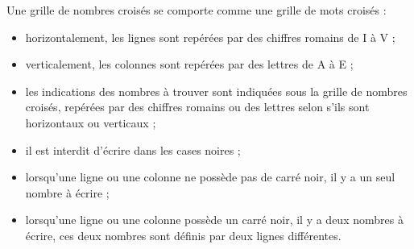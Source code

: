 \begin{colonne*exercice}

\end{colonne*exercice}


\Recreation

      Une grille de nombres croisés se comporte comme une grille de mots croisés :
      \begin{itemize}
         \item horizontalement, les lignes sont repérées par des chiffres romains de I à V ;
         \item verticalement, les colonnes sont repérées par des lettres de A à E ;
         \item les indications des nombres à trouver sont indiquées sous la grille de nombres croisés, repérées par des chiffres romains ou des lettres selon s'ils sont horizontaux ou verticaux ;
         \item il est interdit d'écrire dans les cases noires ;
         \item lorsqu'une ligne ou une colonne ne possède pas de carré noir, il y a un seul nombre à écrire ;
         \item lorsqu'une ligne ou une colonne possède un carré noir, il y a deux nombres à écrire, ces deux nombres sont définis par deux lignes différentes. \\
      \end{itemize}
      
